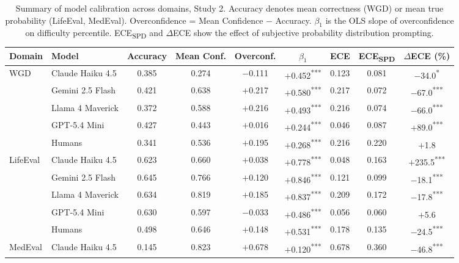 \documentclass{article}
\begin{document}
\begin{table}[t]
\centering
\caption{Summary of model calibration across domains, Study 2. Accuracy denotes mean correctness (WGD) or mean true probability (LifeEval, MedEval). Overconfidence = Mean Confidence $-$ Accuracy. $\beta_1$ is the OLS slope of overconfidence on difficulty percentile. ECE\textsubscript{SPD} and $\Delta$ECE show the effect of subjective probability distribution prompting.}
\label{tab:rq1_summary}
\begin{tabular}{llccccccc}
\toprule
\hline Domain & Model & Accuracy & Mean Conf. & Overconf. & $\beta_1$ & ECE & ECE\textsubscript{SPD} & $\Delta$ECE (\%) \\
\midrule
\multirow{5}{*}{WGD}
 & Claude Haiku 4.5     & 0.385 & 0.274 & $-$0.111 & $+$0.452\textsuperscript{***} & 0.123 & 0.081 & $-$34.0\textsuperscript{*} \\
 & Gemini 2.5 Flash     & 0.421 & 0.638 & $+$0.217 & $+$0.580\textsuperscript{***} & 0.217 & 0.072 & $-$67.0\textsuperscript{***} \\
 & Llama 4 Maverick     & 0.372 & 0.588 & $+$0.216 & $+$0.493\textsuperscript{***} & 0.216 & 0.074 & $-$66.0\textsuperscript{***} \\
 & GPT-5.4 Mini         & 0.427 & 0.443 & $+$0.016 & $+$0.244\textsuperscript{***} & 0.046 & 0.087 & $+$89.0\textsuperscript{***} \\
 & Humans               & 0.341 & 0.536 & $+$0.195 & $+$0.268\textsuperscript{***} & 0.216 & 0.220 & $+$1.8\textsuperscript{} \\
\midrule
\multirow{5}{*}{LifeEval}
 & Claude Haiku 4.5     & 0.623 & 0.660 & $+$0.038 & $+$0.778\textsuperscript{***} & 0.048 & 0.163 & $+$235.5\textsuperscript{***} \\
 & Gemini 2.5 Flash     & 0.645 & 0.766 & $+$0.120 & $+$0.846\textsuperscript{***} & 0.121 & 0.099 & $-$18.1\textsuperscript{***} \\
 & Llama 4 Maverick     & 0.634 & 0.819 & $+$0.185 & $+$0.837\textsuperscript{***} & 0.209 & 0.172 & $-$17.8\textsuperscript{***} \\
 & GPT-5.4 Mini         & 0.630 & 0.597 & $-$0.033 & $+$0.486\textsuperscript{***} & 0.056 & 0.060 & $+$5.6\textsuperscript{} \\
 & Humans               & 0.498 & 0.646 & $+$0.148 & $+$0.531\textsuperscript{***} & 0.178 & 0.135 & $-$24.5\textsuperscript{***} \\
\midrule
\multirow{4}{*}{MedEval}
 & Claude Haiku 4.5     & 0.145 & 0.823 & $+$0.678 & $+$0.120\textsuperscript{***} & 0.678 & 0.360 & $-$46.8\textsuperscript{***} \\

\end{tabular}
\end{table}
\end{document}
